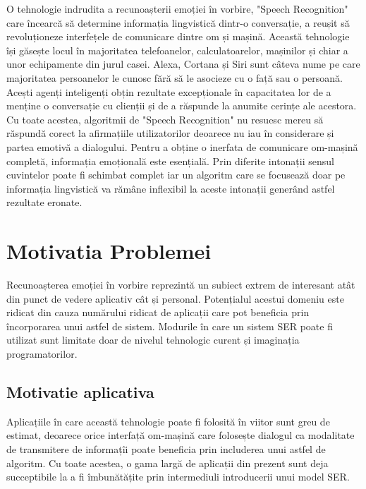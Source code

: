 \documentclass[a4paper,12pt]{book}
\begin{document}
				O tehnologie indrudita a recunoașterii emoției în vorbire, "Speech Recognition" care încearcă să determine informația lingvistică dintr-o conversație, a reușit să revoluționeze interfețele de comunicare dintre om și mașină. Această tehnologie își găsește locul în majoritatea telefoanelor, calculatoarelor, mașinilor și chiar a unor echipamente din jurul casei. Alexa, Cortana și Siri sunt câteva nume pe care majoritatea persoanelor le cunosc fără să le asocieze cu o față sau o persoană. Acești agenți inteligenți obțin rezultate excepționale în capacitatea lor de a menține o conversație cu clienții și de a răspunde la anumite cerințe ale acestora. Cu toate acestea, algoritmii de "Speech Recognition" nu resuesc mereu să răspundă corect la afirmațiile utilizatorilor deoarece nu iau în considerare și partea emotivă a dialogului. Pentru a obține o inerfata de comunicare om-mașină completă, informația emoțională este esențială. Prin diferite intonații sensul cuvintelor poate fi schimbat complet iar un algoritm care se focusează doar pe informația lingvistică va rămâne inflexibil la aceste intonații generând astfel rezultate eronate. \par
					

		\section{Motivatia Problemei}
		Recunoașterea emoției în vorbire reprezintă un subiect extrem de interesant atât din punct de vedere aplicativ cât și personal. Potențialul acestui domeniu este ridicat din cauza numărului ridicat de aplicații care pot beneficia prin încorporarea unui astfel de sistem. Modurile în care un sistem SER poate fi utilizat sunt limitate doar de nivelul tehnologic curent și imaginația programatorilor.
			\subsection{Motivatie aplicativa}				
					Aplicațiile în care această tehnologie poate fi folosită în viitor sunt greu de estimat, deoarece orice interfață om-mașină care folosește dialogul ca modalitate de transmitere de informațîi poate beneficia prin includerea unui astfel de algoritm. Cu toate acestea, o gama largă de aplicații din prezent sunt deja succeptibile la a fi îmbunătățite prin intermediuli introducerii unui model SER. \par
					
\end{document}
